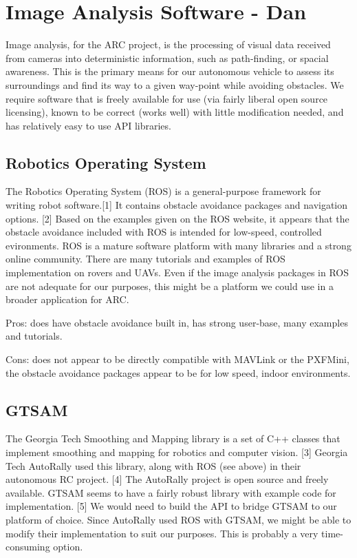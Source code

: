 \documentclass[compsoc,draftclsnofoot,onecolumn,10pt]{IEEEtran}
\begin{document}

\newpage

\section{Image Analysis Software - Dan}
Image analysis, for the ARC project, is the processing of visual data received
from cameras into deterministic information, such as path-finding, or spacial
awareness. This is the primary means for our autonomous vehicle to assess its
surroundings and find its way to a given way-point while avoiding obstacles. We
require software that is freely available for use (via fairly liberal open
source licensing), known to be correct (works well) with little modification
needed, and has relatively easy to use API libraries.

\subsection{Robotics Operating System}
The Robotics Operating System (ROS) is a general-purpose framework for writing
robot software.[1] It contains obstacle avoidance packages and navigation
options. [2] Based on the examples given on the ROS website, it appears that the
obstacle avoidance included with ROS is intended for low-speed, controlled
evironments. ROS is a mature software platform with many libraries and a strong
online community.  There are many tutorials and examples of ROS implementation
on rovers and UAVs.  Even if the image analysis packages in ROS are not adequate
for our purposes, this might be a platform we could use in a broader application
for ARC.

Pros: does have obstacle avoidance built in, has strong user-base, many examples
and tutorials.

Cons: does not appear to be directly compatible with MAVLink or the PXFMini, the
obstacle avoidance packages appear to be for low speed, indoor environments.

\subsection{GTSAM}
The Georgia Tech Smoothing and Mapping library is a set of C++ classes that
implement smoothing and mapping for robotics and computer vision. [3] Georgia
Tech AutoRally used this library, along with ROS (see above) in their autonomous RC
project. [4] The AutoRally project is open source and freely available. GTSAM
seems to have a fairly robust library with example code for implementation. [5]
We would need to build the API to bridge GTSAM to our platform of choice. Since
AutoRally used ROS with GTSAM, we might be able to modify their implementation
to suit our purposes. This is probably a very time-consuming option.
\end{document}
